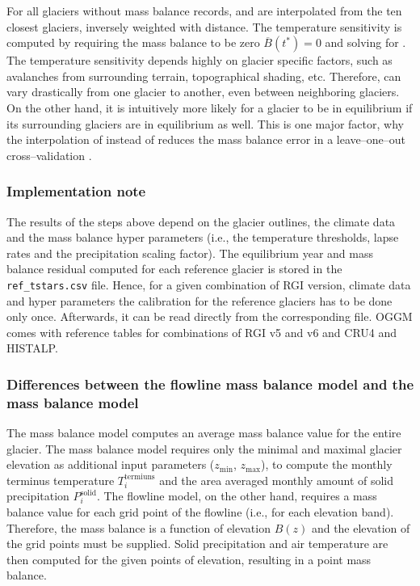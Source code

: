             For all glaciers without mass balance records, \tstar{} and \bias{} are interpolated from the ten closest glaciers, inversely weighted with distance. The temperature sensitivity is computed by requiring the mass balance to be zero $\overline B(t^*) = 0$ and solving for \mustar{}. The temperature sensitivity \mustar{} depends highly on glacier specific factors, such as avalanches from surrounding terrain, topographical shading, etc. Therefore, \mustar{} can vary drastically from one glacier to another, even between neighboring glaciers. On the other hand, it is intuitively more likely for a glacier to be in equilibrium if its surrounding glaciers are in equilibrium as well. This is one major factor, why the interpolation of \tstar{} instead of \mustar{} reduces the mass balance error in a leave--one--out cross--validation \citep[cf.][]{Marzeion2012b, Maussion2019}.


        \subsubsection{Implementation note} %
        \label{ssub:mb_calib_implementation_note}

            The results of the steps above depend on the glacier outlines, the climate data and the mass balance hyper parameters (i.e., the temperature thresholds, lapse rates and the precipitation scaling factor). The equilibrium year \tstar{} and mass balance residual \bias{} computed for each reference glacier is stored in the \lstinline`ref_tstars.csv` file. Hence, for a given combination of RGI version, climate data and hyper parameters the calibration for the reference glaciers has to be done only once. Afterwards, it can be read directly from the corresponding file. OGGM comes with reference tables for combinations of RGI v5 and v6 and CRU4 and HISTALP.
        

        \subsubsection{Differences between the flowline mass balance model and the \vas{} mass balance model}

            The \vas{} mass balance model computes an average mass balance value for the entire glacier. The mass balance model requires only the minimal and maximal glacier elevation as additional input parameters ($z_\text{min}$, $z_\text{max}$), to compute the monthly terminus temperature $T_i^\text{termiuns}$ and the area averaged monthly amount of solid precipitation $P_i^\text{solid}$. The flowline model, on the other hand, requires a mass balance value for each grid point of the flowline (i.e., for each elevation band). Therefore, the mass balance is a function of elevation $B(z)$ and the elevation of the grid points must be supplied. Solid precipitation and air temperature are then computed for the given points of elevation, resulting in a point mass balance.
    
